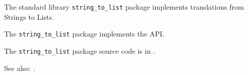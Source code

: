 
The standard library {\tt string\_to\_list} package implements translations from 
Strings to Lists.

The {\tt string\_to\_list} package implements the  API.

The {\tt string\_to\_list} package source code is in .

See also:  .
